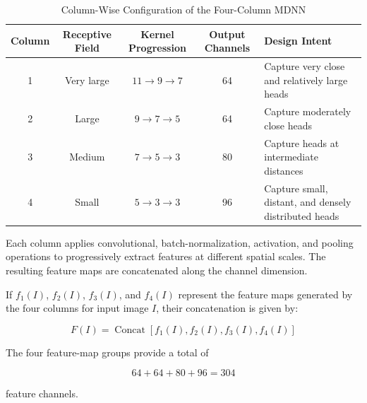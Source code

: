 \documentclass[12pt,a4paper]{report}
\begin{document}
\begin{table}[htbp]
\centering
\caption{Column-Wise Configuration of the Four-Column MDNN}
\label{tab:mdnn-columns}
\renewcommand{\arraystretch}{1.2}

\begin{tabularx}{\textwidth}{c c c c X}
\hline
\textbf{Column} &
\textbf{Receptive Field} &
\textbf{Kernel Progression} &
\textbf{Output Channels} &
\textbf{Design Intent} \\
\hline

1 & Very large & $11 \rightarrow 9 \rightarrow 7$ & 64 &
Capture very close and relatively large heads \\

\hline

2 & Large & $9 \rightarrow 7 \rightarrow 5$ & 64 &
Capture moderately close heads \\

\hline

3 & Medium & $7 \rightarrow 5 \rightarrow 3$ & 80 &
Capture heads at intermediate distances \\

\hline

4 & Small & $5 \rightarrow 3 \rightarrow 3$ & 96 &
Capture small, distant, and densely distributed heads \\

\hline
\end{tabularx}
\end{table}


Each column applies convolutional, batch-normalization, activation, and
pooling operations to progressively extract features at different spatial
scales. The resulting feature maps are concatenated along the channel
dimension.

If $f_1(I)$, $f_2(I)$, $f_3(I)$, and $f_4(I)$ represent the feature maps
generated by the four columns for input image $I$, their concatenation is
given by:

\begin{equation}
F(I)
=
\operatorname{Concat}
\left[
f_1(I),
f_2(I),
f_3(I),
f_4(I)
\right]
\label{eq:mdnn-concat}
\end{equation}

The four feature-map groups provide a total of

\begin{equation}
64+64+80+96=304
\label{eq:mdnn-channels}
\end{equation}

feature channels.
\end{document}
